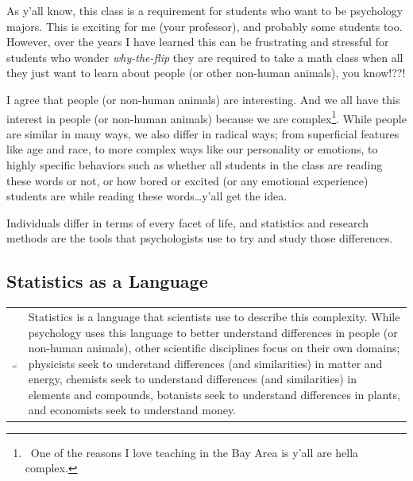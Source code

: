 \documentclass[
  letterpaper,
  DIV=11,
  numbers=noendperiod]{scrreprt}
\begin{document}
As y'all know, this class is a requirement for students who want to be
psychology majors. This is exciting for me (your professor), and
probably some students too. However, over the years I have learned this
can be frustrating and stressful for students who wonder
\emph{why-the-flip} they are required to take a math class when all they
just want to learn about people (or other non-human animals), you
know!??!

I agree that people (or non-human animals) are interesting. And we all
have this interest in people (or non-human animals) because we are
complex\footnote{~One of the reasons I love teaching in the Bay Area is
  y'all are hella complex.}. While people are similar in many ways, we
also differ in radical ways; from superficial features like age and
race, to more complex ways like our personality or emotions, to highly
specific behaviors such as whether all students in the class are reading
these words or not, or how bored or excited (or any emotional
experience) students are while reading these words\ldots y'all get the
idea.

Individuals differ in terms of every facet of life, and statistics and
research methods are the tools that psychologists use to try and study
those differences.

\subsection{Statistics as a Language}\label{statistics-as-a-language}

\begin{longtable}[]{@{}
  >{\raggedright\arraybackslash}p{}
  >{\raggedright\arraybackslash}p{}@{}}
\toprule\noalign{}
\endhead
\bottomrule\noalign{}
\endlastfoot
\includegraphics[width=0.52083in,height=\textheight]{images/stat_cat_talk_right.png}
& Statistics is a language that scientists use to describe this
complexity. While psychology uses this language to better understand
differences in people (or non-human animals), other scientific
disciplines focus on their own domains; physicists seek to understand
differences (and similarities) in matter and energy, chemists seek to
understand differences (and similarities) in elements and compounds,
botanists seek to understand differences in plants, and economists seek
to understand money. \\
\end{longtable}
\end{document}
